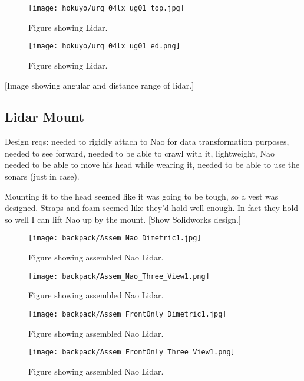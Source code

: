 \begin{figure}
\centering
\texttt{[image: hokuyo/urg\_04lx\_ug01\_top.jpg]}
\caption{Figure showing Lidar.}
\label{fig:lidar_top1}
\end{figure}

\begin{figure}
\centering
\texttt{[image: hokuyo/urg\_04lx\_ug01\_ed.png]}
\caption{Figure showing Lidar.}
\label{fig:lidar_diagram1}
\end{figure}

[Image showing angular and distance range of lidar.]

\clearpage

\subsection{Lidar Mount}
Design reqs: needed to rigidly attach to Nao for data transformation purposes, needed to see forward,
needed to be able to crawl with it, lightweight, Nao needed to be able to move his head while wearing it,
needed to be able to use the sonars (just in case).

Mounting it to the head seemed like it was going to be tough, so a vest was designed.
Straps and foam seemed like they'd hold well enough. In fact they hold so well I can lift Nao up by the mount.
[Show Solidworks design.]
\begin{figure}
\centering
\texttt{[image: backpack/Assem\_Nao\_Dimetric1.jpg]}
\caption{Figure showing assembled Nao Lidar.}
\label{fig:nao_lidar_mount_nao_dimetric1}
\end{figure}

\begin{figure}
\centering
\texttt{[image: backpack/Assem\_Nao\_Three\_View1.png]}
\caption{Figure showing assembled Nao Lidar.}
\label{fig:nao_lidar_mount_nao_three_view1}
\end{figure}

\begin{figure}
\centering
\texttt{[image: backpack/Assem\_FrontOnly\_Dimetric1.jpg]}
\caption{Figure showing assembled Nao Lidar.}
\label{fig:nao_lidar_mount_dimetric1}
\end{figure}

\begin{figure}
\centering
\texttt{[image: backpack/Assem\_FrontOnly\_Three\_View1.png]}
\caption{Figure showing assembled Nao Lidar.}
\label{fig:nao_lidar_mount_three_view1}
\end{figure}

